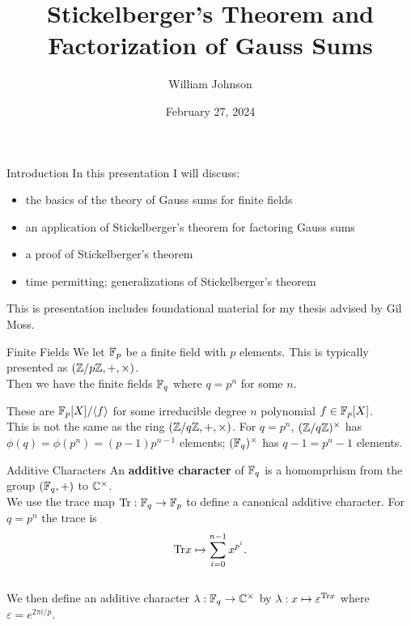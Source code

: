 \documentclass[presentation]{beamer}
\title[] %
{Stickelberger's Theorem and Factorization of Gauss Sums
}
\author[WJ]
{William Johnson
}
\institute[2024] 
{
 University of Maine
}
\date[Thesis 2024]
{February 27, 2024}
\begin{document}
\frame{\titlepage}


\begin{frame}{Introduction}
\bigskip
In this presentation I will discuss:
\begin{itemize}
    \item the basics of the theory of Gauss sums for finite fields
    \item an application of Stickelberger's theorem for factoring Gauss sums
    \item a proof of Stickelberger's theorem 
    \item time permitting; generalizations of Stickelberger's theorem
\end{itemize}
\bigskip
This is presentation includes foundational material for my thesis advised by Gil Moss. 
\end{frame}


\begin{frame}{Finite Fields}
We let $\mathbb{F}_p$ be a finite field with $p$ elements. This is typically presented as $(\mathbb{Z} / p \mathbb{Z}, +, \times)$.\\


Then we have the finite fields $\mathbb{F}_q$ where $q = p^n$ for some $n$. 


These are $\mathbb{F}_p[X]/\langle f \rangle$ for some irreducible degree $n$ polynomial $f \in \mathbb{F}_p[X]$. \\
This is not the same as the ring $(\mathbb{Z}/ q \mathbb{Z}, +, \times)$. For $q = p^n$, $(\mathbb{Z}/q\mathbb{Z})^\times$ has $\phi(q) = \phi(p^n) = (p-1)p^{n-1}$ elements; $(\mathbb{F}_q)^\times$ has $q-1 = p^n - 1$ elements.
\end{frame}

\begin{frame}{Additive Characters}
An \textbf{additive character} of $\mathbb{F}_q$ is a homomprhism from the group $(\mathbb{F}_q, +)$ to $\mathbb{C}^\times$. \\


We use the trace map $\textrm{Tr} : \mathbb{F}_q \to \mathbb{F}_p$ to define a canonical additive character. For $q = p^n$ the trace is \[\textrm{Tr} x \mapsto \sum_{i=0}^{n-1} x^{p^i}.\]\\


We then define an additive character $\lambda : \mathbb{F}_q \to \mathbb{C}^\times$ by $\lambda : x \mapsto \varepsilon^{\textrm{Tr} x}$ where $\varepsilon = e^{2 \pi i /p}$. 

\end{frame}
\end{document}
